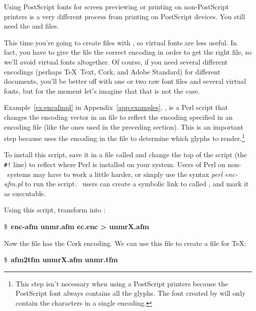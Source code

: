 Using PostScript fonts for screen previewing or printing on non-PostScript
printers is a very different process from printing on PostScript devices.
You still need the  and  files.

This time you're going to create  files with , so
virtual fonts are less useful.  In fact, you have to give the  file
the correct encoding in order to get the right  file, so we'll
avoid virtual fonts altogether.  Of course, if you need several different encodings
(perhaps \TeX\ Text, Cork, and Adobe Standard) for different documents, you'll
be better off with one or two raw font files and several virtual fonts, but
for the moment let's imagine that that is not the case.

Example~\ref{ex:encafmpl} in Appendix~\ref{app:examples},
\textit{}, is a Perl script that changes the encoding
vector in an  file to reflect the encoding specified in an encoding
file (like the ones used in the preceding section).  This is an important step
because  uses the encoding in the  file to determine
which glyphs to render.\footnote{This step isn't necessary when using a
PostScript printers because the PostScript font always contains all the
glyphs.  The font created by  will only contain the characters
in a single encoding.}

To install this script, save it in a file called  and
change the top of the script (the \verb|#!| line) to reflect where Perl is
installed on your system.  Users of Perl on non-\Unix\ systems may have to
work a little harder, or simply use the syntax \textit{perl
enc-afm.pl} to run the script.  \Unix\ users can create a symbolic link to
 called , and mark it as executable.

Using this script, transform  into :

\begin{ttindent}
\$\ \textbf{enc-afm unmr.afm ec.enc > unmrX.afm}
\end{ttindent}

\newpage
Now the  file has the Cork encoding.  We can use this
file to create a  file for \TeX:

\begin{ttindent}
\$\ \textbf{afm2tfm unmrX.afm unmr.tfm}
\end{ttindent}


